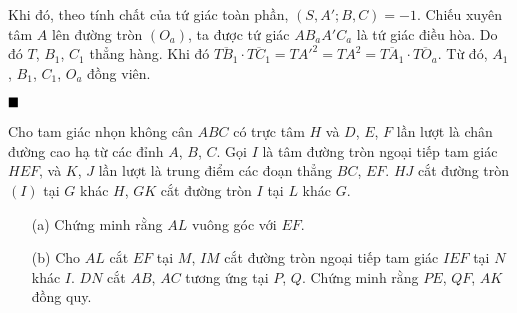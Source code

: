 \documentclass{article} %
\newenvironment{solution}[1][Lời giải]{%
  \proof[\faPenNib \hspace{0.2cm} \ttfamily \scshape \large #1]%
}{\(\hfill \blacksquare\){\parfillskip0pt\par}}
\begin{document}
\begin{solution}
\begin{enumerate}
                Khi đó, theo tính chất của tứ giác toàn phần, \((S,A';B,C) = -1\). Chiếu xuyên tâm \(A\) lên đường tròn \((O_a)\), ta được tứ giác \(AB_aA'C_a\) là tứ giác điều hòa. Do đó \(T\), \(B_1\), \(C_1\) thẳng hàng. Khi đó \(\overline{TB_1} \cdot \overline{TC_1} = TA'^2 = TA^2 = \overline{TA_1} \cdot \overline{TO_a}\). Từ đó, \(A_1\), \(B_1\), \(C_1\), \(O_a\) đồng viên.
            \end{enumerate}
        \end{solution}

        \begin{problem}
            Cho tam giác nhọn không cân \(ABC\) có trực tâm \(H\) và \(D\), \(E\), \(F\) lần lượt là chân đường cao hạ từ các đỉnh \(A\), \(B\), \(C\). Gọi \(I\) là tâm đường tròn ngoại tiếp tam giác \(HEF\), và \(K\), \(J\) lần lượt là trung điểm các đoạn thẳng \(BC\), \(EF\). \(HJ\) cắt đường tròn \((I)\) tại \(G\) khác \(H\), \(GK\) cắt đường tròn \(I\) tại \(L\) khác \(G\).
            \begin{enumerate}
                \item[(a)] Chứng minh rằng \(AL\) vuông góc với \(EF\).
                \item[(b)] Cho \(AL\) cắt \(EF\) tại \(M\), \(IM\) cắt đường tròn ngoại tiếp tam giác \(IEF\) tại \(N\) khác \(I\). \(DN\) cắt \(AB\), \(AC\) tương ứng tại \(P\), \(Q\). Chứng minh rằng \(PE\), \(QF\), \(AK\) đồng quy.
            \end{enumerate}
        \end{problem}
\end{document}
